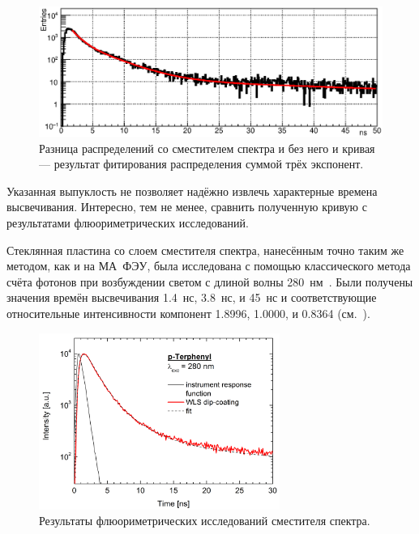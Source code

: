 \begin{figure}[H]
\centering
\includegraphics[width=1.0\textwidth]{pictures/27_WLSdiff_8feb.eps}
\caption{Разница распределений со сместителем спектра и без него и кривая --- результат фитирования распределения суммой трёх экспонент.}
\label{fig:WLSdiff}
\end{figure}

Указанная выпуклость не позволяет надёжно извлечь характерные времена высвечивания. Интересно, тем не менее, сравнить полученную кривую с результатами флюориметрических исследований.

Стеклянная пластина со слоем сместителя спектра, нанесённым точно таким же методом, как и на МА~ФЭУ, была исследована с помощью классического метода счёта фотонов при возбуждении светом с длиной волны 280~нм~\cite{DUERR}. Были получены значения времён высвечивания 1.4~нс, 3.8~нс, и 45~нс и соответствующие относительные интенсивности компонент 1.8996, 1.0000, и 0.8364 (см.~).

\begin{figure}[H]
\includegraphics[width=0.7\textwidth]{pictures/Tau_fluoro_WLS_JLU.png}
\caption{Результаты флюориметрических исследований сместителя спектра.} %
\label{fig:MichaelProfile}
\end{figure}

